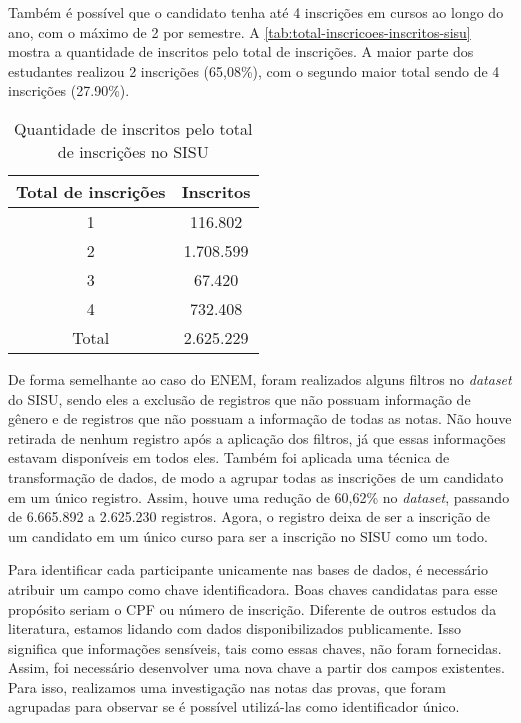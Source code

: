 Também é possível que o candidato tenha até 4 inscrições em cursos ao longo do ano, com o máximo de 2 por semestre. A \autoref{tab:total-inscricoes-inscritos-sisu} mostra a quantidade de inscritos pelo total de inscrições. A maior parte dos estudantes realizou 2 inscrições (65,08\%), com o segundo maior total sendo de 4 inscrições (27.90\%). 

\begin{table}[]
  \centering
  \begin{tabular}{cc}
  \hline
  \textbf{Total de inscrições} & \textbf{Inscritos} \\ \hline
  1                   & 116.802    \\ \hline
  2                   & 1.708.599   \\ \hline
  3                   & 67.420     \\ \hline
  4                   & 732.408    \\ \hline
  Total               & 2.625.229   \\ \hline
  \end{tabular}
  \caption{Quantidade de inscritos pelo total de inscrições no SISU}
  \label{tab:total-inscricoes-inscritos-sisu}
  \end{table}

De forma semelhante ao caso do ENEM, foram realizados alguns filtros no \textit{dataset} do SISU, sendo eles a exclusão de registros que não possuam informação de gênero e de registros que não possuam a informação de todas as notas. Não houve retirada de nenhum registro após a aplicação dos filtros, já que essas informações estavam disponíveis em todos eles. Também foi aplicada uma técnica de transformação de dados, de modo a agrupar todas as inscrições de um candidato em um único registro. Assim, houve uma redução de 60,62\% no \textit{dataset}, passando de 6.665.892 a 2.625.230 registros. Agora, o registro deixa de ser a inscrição de um candidato em um único curso para ser a inscrição no SISU como um todo.

Para identificar cada participante unicamente nas bases de dados, é necessário atribuir um campo como chave identificadora. Boas chaves candidatas para esse propósito seriam o CPF ou número de inscrição. Diferente de outros estudos da literatura, estamos lidando com dados disponibilizados publicamente. Isso significa que informações sensíveis, tais como essas chaves, não foram fornecidas. Assim, foi necessário desenvolver uma nova chave a partir dos campos existentes. 
Para isso, realizamos uma investigação nas notas das provas, que foram agrupadas 
para observar se é possível utilizá-las como identificador único. 

